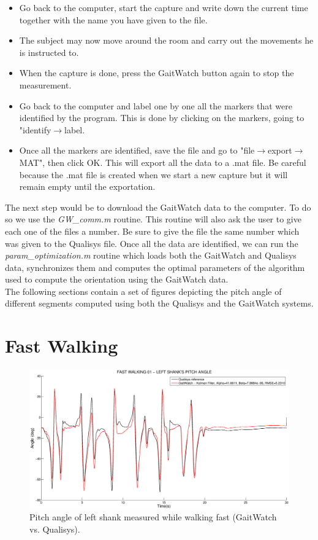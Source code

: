 \begin{itemize}
\item Go back to the computer, start the capture and write down the current time together with the name you have given to the file. 
\item The subject may now move around the room and carry out the movements he is instructed to. 
\item When the capture is done, press the GaitWatch button again to stop the measurement. 
\item Go back to the computer and label one by one all the markers that were identified by the program. This is done by clicking on the markers, going to "identify$\rightarrow$label. 
\item Once all the markers are identified, save the file and go to "file$\rightarrow$export$\rightarrow$MAT", then click OK. This will export all the data to a .mat file. Be careful because the .mat file is created when we start a new capture but it will remain empty until the exportation. 
\end{itemize}

The next step would be to download the GaitWatch data to the computer. To do so we use the \textit{GW\_comm.m} routine. This routine will also ask the user to give each one of the files a number. Be sure to give the file the same number which was given to the Qualisys file. Once all the data are identified, we can run the \textit{param\_optimization.m} routine which loads both the GaitWatch and Qualisys data, synchronizes them and computes the optimal parameters of the algorithm used to compute the orientation using the GaitWatch data. \\

\indent The following sections contain a set of figures depicting the pitch angle of different segments computed using both the Qualisys and the GaitWatch systems. 

\section{Fast Walking}

\begin{figure}[H]
\centering
\includegraphics[width=1\textwidth]{figures/fast_walking_01_left_shank.eps}
\caption{Pitch angle of left shank measured while walking fast (GaitWatch vs. Qualisys).}
\label{fig:fast_walking_left_shank01}
\end{figure}

